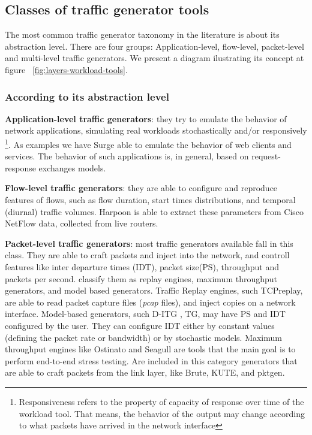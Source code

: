 \subsection{Classes of traffic generator tools}

The most common traffic generator taxonomy in the literature is about its abstraction level\cite{do-you-trust}. There are four groups: Application-level, flow-level, packet-level and multi-level traffic generators. We present a diagram  ilustrating its concept at figure ~\ref{fig:layers-workload-tools}.


\subsubsection{According to its abstraction level}

\textbf{Application-level traffic generators}: they try to emulate the behavior of network applications, simulating real workloads stochastically and/or responsively \footnote{Responsiveness refers to the property of capacity of response over time of the workload tool. That means, the behavior of the output may change according to what packets have arrived in the network interface}. As examples we have Surge\cite{surge-paper} able to emulate the behavior of web clients and services. The behavior of such applications is, in general, based on request-response exchanges models.

\textbf{Flow-level traffic generators}: they are able to configure and reproduce features of flows\cite{do-you-trust}\cite{sourcesonoff-paper}, such as flow duration, start times distributions, and temporal (diurnal) traffic volumes\cite{do-you-trust}. Harpoon \cite{harpoon-paper} is able to extract these parameters from Cisco NetFlow data, collected from live routers.

\textbf{Packet-level traffic generators}: most traffic generators available fall in this class. They are able to craft packets and inject into the network, and controll features like inter departure times (IDT), packet size(PS), throughput and packets per second\cite{validate-trafficgen}. \cite{validate-trafficgen} classify them as replay engines, maximum throughput generators, and model based generators. Traffic Replay engines, such TCPreplay\cite{web-tcpreplay}, are  able to read packet capture files (\textit{pcap} files), and inject copies on a network interface. Model-based generators, such D-ITG \cite{ditg-paper}, TG\cite{web-tg}, may have PS and IDT configured by the user. They can configure IDT  either by constant values (defining the packet rate or bandwidth) or by stochastic models. Maximum throughput engines like Ostinato and Seagull are tools that the main goal is to perform end-to-end stress testing. Are included in this category generators that are able to craft packets from the link layer, like Brute, KUTE, and pktgen.

